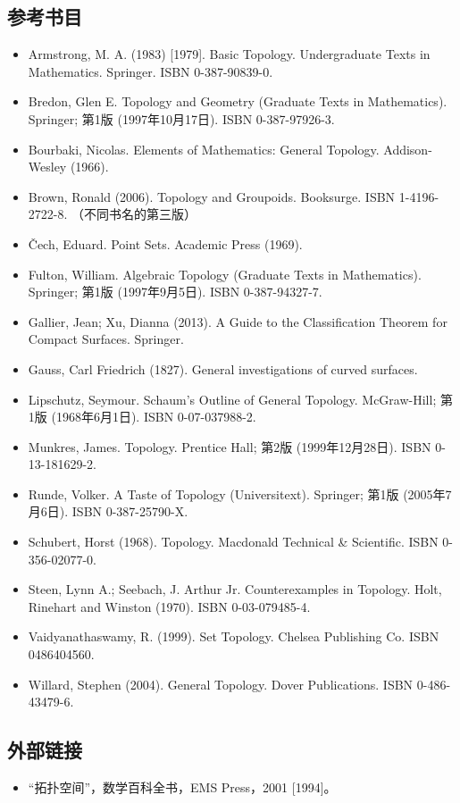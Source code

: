 \subsection{参考书目}
\begin{itemize}
\item Armstrong, M. A. (1983) [1979]. Basic Topology. Undergraduate Texts in Mathematics. Springer. ISBN 0-387-90839-0.
\item Bredon, Glen E. Topology and Geometry (Graduate Texts in Mathematics). Springer; 第1版 (1997年10月17日). ISBN 0-387-97926-3.
\item Bourbaki, Nicolas. Elements of Mathematics: General Topology. Addison-Wesley (1966).
\item Brown, Ronald (2006). Topology and Groupoids. Booksurge. ISBN 1-4196-2722-8. （不同书名的第三版）
\item Čech, Eduard. Point Sets. Academic Press (1969).
\item Fulton, William. Algebraic Topology (Graduate Texts in Mathematics). Springer; 第1版 (1997年9月5日). ISBN 0-387-94327-7.
\item Gallier, Jean; Xu, Dianna (2013). A Guide to the Classification Theorem for Compact Surfaces. Springer.
\item Gauss, Carl Friedrich (1827). General investigations of curved surfaces.
\item Lipschutz, Seymour. Schaum's Outline of General Topology. McGraw-Hill; 第1版 (1968年6月1日). ISBN 0-07-037988-2.
\item Munkres, James. Topology. Prentice Hall; 第2版 (1999年12月28日). ISBN 0-13-181629-2.
\item Runde, Volker. A Taste of Topology (Universitext). Springer; 第1版 (2005年7月6日). ISBN 0-387-25790-X.
\item Schubert, Horst (1968). Topology. Macdonald Technical & Scientific. ISBN 0-356-02077-0.
\item Steen, Lynn A.; Seebach, J. Arthur Jr. Counterexamples in Topology. Holt, Rinehart and Winston (1970). ISBN 0-03-079485-4.
\item Vaidyanathaswamy, R. (1999). Set Topology. Chelsea Publishing Co. ISBN 0486404560.
\item Willard, Stephen (2004). General Topology. Dover Publications. ISBN 0-486-43479-6.
\end{itemize}
\subsection{外部链接}
\begin{itemize}
\item “拓扑空间”，数学百科全书，EMS Press，2001 [1994]。
\end{itemize}